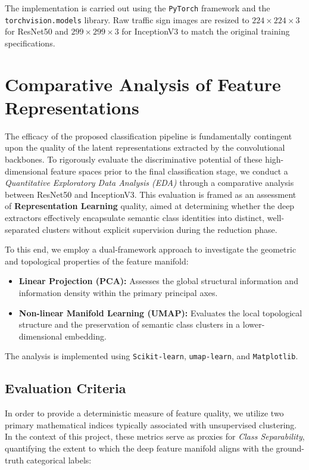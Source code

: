 The implementation is carried out using the \texttt{PyTorch} framework and the \texttt{torchvision.models} library. Raw traffic sign images are resized to $224 \times 224 \times 3$ for ResNet50 and $299 \times 299 \times 3$ for InceptionV3 to match the original training specifications.

\section{Comparative Analysis of Feature Representations}
The efficacy of the proposed classification pipeline is fundamentally contingent upon the quality of the latent representations extracted by the convolutional backbones. To rigorously evaluate the discriminative potential of these high-dimensional feature spaces prior to the final classification stage, we conduct a \textit{Quantitative Exploratory Data Analysis (EDA)} through a comparative analysis between ResNet50 and InceptionV3. This evaluation is framed as an assessment of \textbf{Representation Learning} quality, aimed at determining whether the deep extractors effectively encapsulate semantic class identities into distinct, well-separated clusters without explicit supervision during the reduction phase.

To this end, we employ a dual-framework approach to investigate the geometric and topological properties of the feature manifold:
\begin{itemize}
    \item \textbf{Linear Projection (PCA):} Assesses the global structural information and information density within the primary principal axes.
    \item \textbf{Non-linear Manifold Learning (UMAP):} Evaluates the local topological structure and the preservation of semantic class clusters in a lower-dimensional embedding.
\end{itemize}
The analysis is implemented using \texttt{Scikit-learn}, \texttt{umap-learn}, and \texttt{Matplotlib}.

\subsection{Evaluation Criteria}
In order to provide a deterministic measure of feature quality, we utilize two primary mathematical indices typically associated with unsupervised clustering. In the context of this project, these metrics serve as proxies for \textit{Class Separability}, quantifying the extent to which the deep feature manifold aligns with the ground-truth categorical labels:

